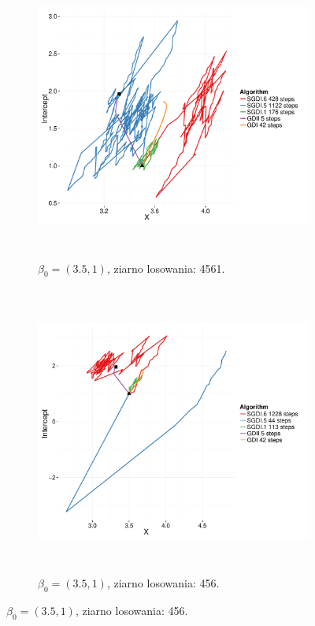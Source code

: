 \begin{figure}[hbt!]
  \begin{center}
   \begin{subfigure}[h!]{0.9\textwidth}
      \includegraphics[width=\textwidth, height=270pt]{Obrazki/sgd_35_1_1.pdf}
      \caption{$\beta_0 = (3.5,1)$, ziarno losowania: 4561.}
   \end{subfigure}     
   \begin{subfigure}[h!]{0.9\textwidth}
      \includegraphics[width=\textwidth, height=270pt]{Obrazki/sgd_35_1_2.pdf}
      \caption{$\beta_0 = (3.5,1)$, ziarno losowania: 456.}
   \end{subfigure}  \end{center}

\end{figure}
